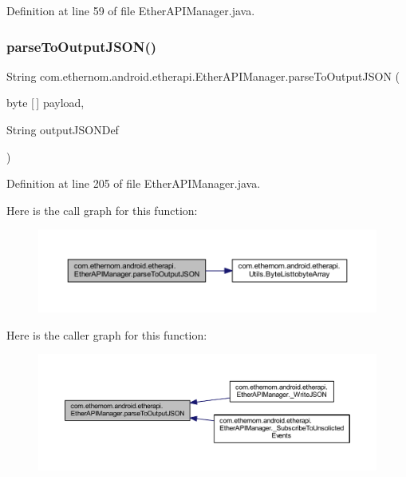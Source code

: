Definition at line 59 of file Ether\+A\+P\+I\+Manager.\+java.

\mbox{\label{classcom_1_1ethernom_1_1android_1_1etherapi_1_1_ether_a_p_i_manager_a6c1c984afa4e13272013e7062177cd24}} 
\subsubsection{\texorpdfstring{parse\+To\+Output\+J\+S\+O\+N()}{parseToOutputJSON()}}
{\footnotesize\ttfamily String com.\+ethernom.\+android.\+etherapi.\+Ether\+A\+P\+I\+Manager.\+parse\+To\+Output\+J\+S\+ON (\begin{DoxyParamCaption}\item[{byte \mbox{[}$\,$\mbox{]}}]{payload,  }\item[{String}]{output\+J\+S\+O\+N\+Def }\end{DoxyParamCaption})\hspace{0.3cm}{\ttfamily [private]}}



Definition at line 205 of file Ether\+A\+P\+I\+Manager.\+java.

Here is the call graph for this function\+:\nopagebreak
\begin{figure}[H]
\begin{center}
\leavevmode
\includegraphics[width=350pt]{classcom_1_1ethernom_1_1android_1_1etherapi_1_1_ether_a_p_i_manager_a6c1c984afa4e13272013e7062177cd24_cgraph}
\end{center}
\end{figure}
Here is the caller graph for this function\+:
\nopagebreak
\begin{figure}[H]
\begin{center}
\leavevmode
\includegraphics[width=350pt]{classcom_1_1ethernom_1_1android_1_1etherapi_1_1_ether_a_p_i_manager_a6c1c984afa4e13272013e7062177cd24_icgraph}
\end{center}
\end{figure}


